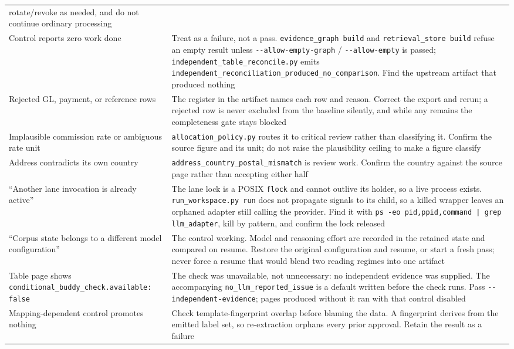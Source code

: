 \documentclass[
]{article}
\begin{document}
{\begin{longtable}[]{@{}
  >{\raggedright\arraybackslash}p{}
  >{\raggedright\arraybackslash}p{}@{}}
rotate/revoke as needed, and do not continue ordinary processing \\
Control reports zero work done & Treat as a failure, not a pass.
\texttt{evidence\_\allowbreak{}graph build} and
\texttt{retrieval\_\allowbreak{}store build} refuse an empty result
unless \texttt{-\/-allow-empty-graph} / \texttt{-\/-allow-empty} is
passed;
\texttt{independent\_\allowbreak{}table\_\allowbreak{}reconcile.py}
emits
\texttt{independent\_\allowbreak{}reconciliation\_\allowbreak{}produced\_\allowbreak{}no\_\allowbreak{}comparison}.
Find the upstream artifact that produced nothing \\
Rejected GL, payment, or reference rows & The register in the artifact
names each row and reason. Correct the export and rerun; a rejected row
is never excluded from the baseline silently, and while any remains the
completeness gate stays blocked \\
Implausible commission rate or ambiguous rate unit &
\texttt{allocation\_\allowbreak{}policy.py} routes it to critical review
rather than classifying it. Confirm the source figure and its unit; do
not raise the plausibility ceiling to make a figure classify \\
Address contradicts its own country &
\texttt{address\_\allowbreak{}country\_\allowbreak{}postal\_\allowbreak{}mismatch}
is review work. Confirm the country against the source page rather than
accepting either half \\
``Another lane invocation is already active'' & The lane lock is a POSIX
\texttt{flock} and cannot outlive its holder, so a live process exists.
\texttt{run\_\allowbreak{}workspace.py run} does not propagate signals
to its child, so a killed wrapper leaves an orphaned adapter still
calling the provider. Find it with
\texttt{ps -\allowbreak{}eo pid,ppid,command | grep llm\_\allowbreak{}adapter},
kill by pattern, and confirm the lock released \\
``Corpus state belongs to a different model configuration'' & The
control working. Model and reasoning effort are recorded in the retained
state and compared on resume. Restore the original configuration and
resume, or start a fresh pass; never force a resume that would blend two
reading regimes into one artifact \\
Table page shows
\texttt{conditional\_\allowbreak{}buddy\_\allowbreak{}check.available: false}
& The check was unavailable, not unnecessary: no independent evidence
was supplied. The accompanying
\texttt{no\_\allowbreak{}llm\_\allowbreak{}reported\_\allowbreak{}issue}
is a default written before the check runs. Pass
\texttt{-\/-independent-evidence}; pages produced without it ran with
that control disabled \\
Mapping-dependent control promotes nothing & Check template-fingerprint
overlap before blaming the data. A fingerprint derives from the emitted
label set, so re-extraction orphans every prior approval. Retain the
result as a failure \\
\end{longtable}
}
\end{document}
